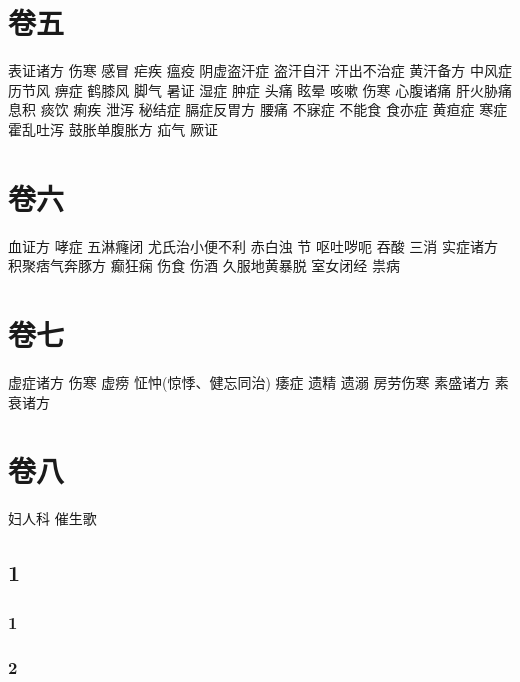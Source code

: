 \documentclass[a4paper,12pt,UTF8,twoside]{ctexbook}
\begin{document}
\part{卷五}
表证诸方
伤寒
感冒
疟疾
瘟疫
阴虚盗汗症
盗汗自汗
汗出不治症
黄汗备方
中风症
历节风
痹症
鹤膝风
脚气
暑证
湿症
肿症
头痛
眩晕
咳嗽
伤寒
心腹诸痛
肝火胁痛
息积
痰饮
痢疾
泄泻
秘结症
膈症反胃方
腰痛
不寐症
不能食
食亦症
黄疸症
寒症
霍乱吐泻
鼓胀单腹胀方
疝气
厥证
\part{卷六}
血证方
哮症
五淋癃闭
尤氏治小便不利
赤白浊 节
呕吐哕呃
吞酸
三消
实症诸方
积聚痞气奔豚方
癫狂痫
伤食
伤酒
久服地黄暴脱
室女闭经
祟病
\part{卷七}
虚症诸方
伤寒
虚痨
怔忡(惊悸、健忘同治) 
痿症
遗精
遗溺
房劳伤寒
素盛诸方
素衰诸方
\part{卷八}
妇人科
催生歌


\chapter{1}
\section{1}
\section{2}
\end{document}
